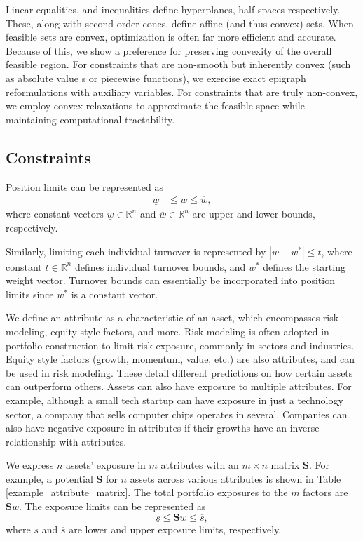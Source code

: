 \documentclass[11pt, letterpaper]{article}
\begin{document}
Linear equalities, and inequalities define hyperplanes, half-spaces respectively. These, along with second-order cones, define affine (and thus convex) sets. When feasible sets are convex, optimization is often far more efficient and accurate. Because of this, we show a preference for preserving convexity of the overall feasible region. For constraints that are non-smooth but inherently convex (such as absolute value s or piecewise functions), we
exercise exact epigraph reformulations with auxiliary variables. For constraints that are truly non-convex, we employ convex relaxations to approximate the feasible space while maintaining computational tractability.

\subsection{Constraints}
Position limits can be represented as
\begin{align*}
    \underline{w} & \leq w \leq \overline{w},
\end{align*}
where constant vectors $\underline{w} \in \mathds{R}^n$ and $\overline{w} \in \mathds{R}^n$ are upper and lower bounds, respectively.

Similarly, limiting each individual turnover is represented by $|w - w^*| \leq t$,
where constant $t \in \mathds{R}^n$ defines individual turnover bounds, and $w^*$ defines the starting weight vector. Turnover bounds can essentially be incorporated into position limits since $w^*$ is a constant vector.

We define an attribute as a characteristic of an asset, which encompasses risk modeling, equity style factors, and more. Risk
modeling is often adopted in portfolio construction to limit risk exposure, commonly in sectors and industries. Equity style
factors (growth, momentum, value, etc.) are also attributes, and can be used in risk modeling. These detail different
predictions on how certain assets can outperform others.
Assets can also have exposure to multiple attributes. For example, although a small tech startup can have exposure in just a technology sector, a company that sells computer chips operates in several. Companies can also have negative exposure in attributes if their growths have an inverse relationship with attributes.

We express $n$ assets' exposure in $m$ attributes with an $m\times n$ matrix $\mathbf{S}$. For example, a potential $\mathbf{S}$
for $n$ assets across various attributes is shown in Table \ref{example_attribute_matrix}.  The total portfolio exposures to the
$m$ factors are $\mathbf{S}w$. The exposure limits can be represented as
\begin{equation}
    \underline{s} \leq \mathbf{S}w \leq \overline{s},
\end{equation}
where $\underline{s}$ and $\overline{s}$ are lower and upper exposure limits, respectively.
\end{document}
